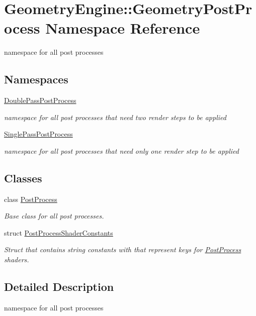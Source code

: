 \hypertarget{namespace_geometry_engine_1_1_geometry_post_process}{}\section{Geometry\+Engine\+::Geometry\+Post\+Process Namespace Reference}
\label{namespace_geometry_engine_1_1_geometry_post_process}


namespace for all post processes  


\subsection*{Namespaces}
\begin{DoxyCompactItemize}
\item 
 \mbox{\hyperlink{namespace_geometry_engine_1_1_geometry_post_process_1_1_double_pass_post_process}{Double\+Pass\+Post\+Process}}
\begin{DoxyCompactList}\small\item\em namespace for all post processes that need two render steps to be applied \end{DoxyCompactList}\item 
 \mbox{\hyperlink{namespace_geometry_engine_1_1_geometry_post_process_1_1_single_pass_post_process}{Single\+Pass\+Post\+Process}}
\begin{DoxyCompactList}\small\item\em namespace for all post processes that need only one render step to be applied \end{DoxyCompactList}\end{DoxyCompactItemize}
\subsection*{Classes}
\begin{DoxyCompactItemize}
\item 
class \mbox{\hyperlink{class_geometry_engine_1_1_geometry_post_process_1_1_post_process}{Post\+Process}}
\begin{DoxyCompactList}\small\item\em Base class for all post processes. \end{DoxyCompactList}\item 
struct \mbox{\hyperlink{struct_geometry_engine_1_1_geometry_post_process_1_1_post_process_shader_constants}{Post\+Process\+Shader\+Constants}}
\begin{DoxyCompactList}\small\item\em Struct that contains string constants with that represent keys for \mbox{\hyperlink{class_geometry_engine_1_1_geometry_post_process_1_1_post_process}{Post\+Process}} shaders. \end{DoxyCompactList}\end{DoxyCompactItemize}


\subsection{Detailed Description}
namespace for all post processes 